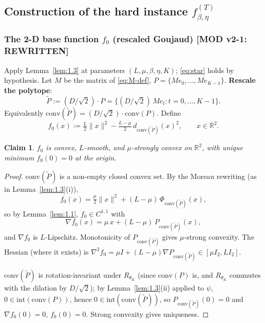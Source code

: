\documentclass[11pt,a4paper]{article}
\theoremstyle{plain}
\newtheorem{claim}[theorem]{Claim}
\theoremstyle{definition}
\theoremstyle{remark}
\newcommand{\R}{\mathbb{R}}
\newcommand{\conv}{\mathrm{conv}}
\begin{document}
\subsection{Construction of the hard instance $f_{\beta,\eta}^{(T)}$}

\subsubsection{The 2-D base function $f_0$ (rescaled Goujaud) \textbf{[MOD v2-1: REWRITTEN]}}

Apply Lemma~\ref{lem:1.3} at parameters $(L, \mu, \beta, \eta, K)$; \eqref{eq:star} holds by hypothesis. Let $M$ be the matrix of \eqref{eq:M-def}, $P = \{M e_0, \ldots, M e_{K-1}\}$. \textbf{Rescale the polytope}:
\[
\widetilde P := (D/\sqrt 2) \cdot P = \{(D/\sqrt 2)\, M e_t : t = 0, \ldots, K-1\}.
\]
Equivalently $\conv(\widetilde P) = (D/\sqrt 2) \cdot \conv(P)$. Define
\begin{equation}
\boxed{\ f_0(x) := \tfrac{L}{2}\|x\|^2 - \tfrac{L - \mu}{2}\, d_{\conv(\widetilde P)}(x)^2,\qquad x \in \R^2.\ }\tag{F0-v2}\label{eq:F0-v2}
\end{equation}

\begin{claim}
\label{cla:2.1}
$f_0$ is convex, $L$-smooth, and $\mu$-strongly convex on $\R^2$, with unique minimum $f_0(0) = 0$ at the origin.
\end{claim}

\begin{proof}
$\conv(\widetilde P)$ is a non-empty closed convex set. By the Moreau rewriting (as in Lemma~\ref{lem:1.3}(i)),
\[
f_0(x) = \tfrac{\mu}{2}\|x\|^2 + (L - \mu)\, \Phi_{\conv(\widetilde P)}(x),
\]
so by Lemma~\ref{lem:1.1}, $f_0 \in C^{1,1}$ with
\begin{equation}
\nabla f_0(x) = \mu\, x + (L - \mu)\, P_{\conv(\widetilde P)}(x),\tag{F0-grad}\label{eq:F0-grad}
\end{equation}
and $\nabla f_0$ is $L$-Lipschitz. Monotonicity of $P_{\conv(\widetilde P)}$ gives $\mu$-strong convexity. The Hessian (where it exists) is $\nabla^2 f_0 = \mu I + (L-\mu)\nabla P_{\conv(\widetilde P)} \in [\mu I_2, L I_2]$.

$\conv(\widetilde P)$ is rotation-invariant under $R_{\theta_K}$ (since $\conv(P)$ is, and $R_{\theta_K}$ commutes with the dilation by $D/\sqrt 2$); by Lemma~\ref{lem:1.3}(ii) applied to $\psi$, $0 \in \mathrm{int}(\conv(P))$, hence $0 \in \mathrm{int}(\conv(\widetilde P))$, so $P_{\conv(\widetilde P)}(0) = 0$ and $\nabla f_0(0) = 0$, $f_0(0) = 0$. Strong convexity gives uniqueness.
\end{proof}
\end{document}
